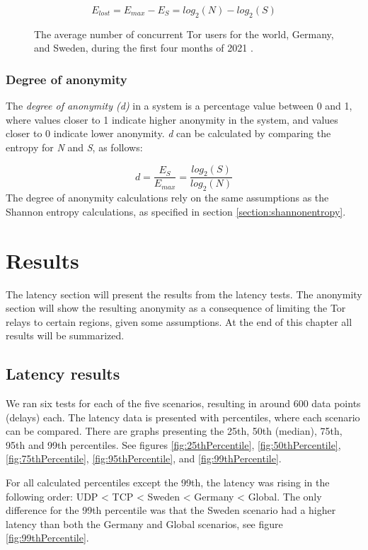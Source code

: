\documentclass{kththesis}
\begin{document}
\[E_{lost} = E_{max} - E_{S} = log_{2}(N) - log_{2}(S)\]

\begin{figure}[htbp]
  \centering
  
  \caption{The average number of concurrent Tor users for the world, Germany, and Sweden, during the first four months of 2021 \parencite{tormetricsUserStats}.}
  \label{fig:numberOfTorUsers}
\end{figure}

\subsection{Degree of anonymity}
The \emph{degree of anonymity (d)} in a system is a percentage value between 0 and 1, where values closer to 1 indicate higher anonymity in the system, and values closer to 0 indicate lower anonymity. \emph{d} can be calculated by comparing the entropy for \emph{N} and \emph{S}, as follows:

\[d = \frac{E_{S}}{E_{max}} = \frac{log_{2}(S)}{log_{2}(N)}\]
The degree of anonymity calculations rely on the same assumptions as the Shannon entropy calculations, as specified in section \ref{section:shannonentropy}.

\chapter{Results}
The latency section will present the results from the latency tests. The anonymity section will show the resulting anonymity as a consequence of limiting the Tor relays to certain regions, given some assumptions. At the end of this chapter all results will be summarized.

\section{Latency results}
We ran six tests for each of the five scenarios, resulting in around 600 data points (delays) each. The latency data is presented with percentiles, where each scenario can be compared. There are graphs presenting the 25th, 50th (median), 75th, 95th and 99th percentiles. See figures \ref{fig:25thPercentile}, \ref{fig:50thPercentile}, \ref{fig:75thPercentile}, \ref{fig:95thPercentile}, and \ref{fig:99thPercentile}.

For all calculated percentiles except the 99th, the latency was rising in the following order: UDP < TCP < Sweden < Germany < Global. The only difference for the 99th percentile was that the Sweden scenario had a higher latency than both the Germany and Global scenarios, see figure \ref{fig:99thPercentile}.
\end{document}

